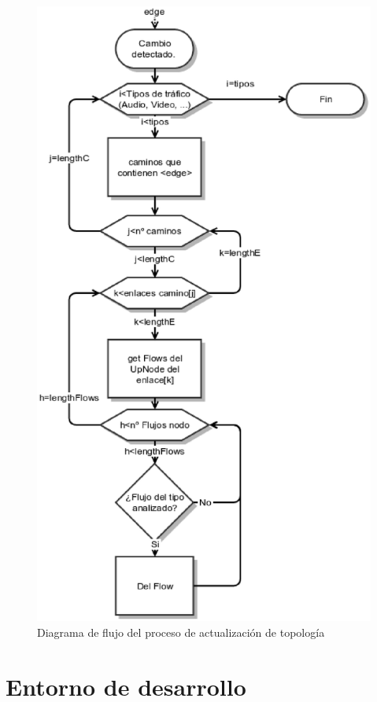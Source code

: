 \documentclass[a4paper,11pt]{book}
\begin{document}
\begin{figure}[tb]
\centering
\includegraphics[scale=0.7]{./figuras/updateTopology}
\caption{Diagrama de flujo del proceso de actualización de topología}\label{updateTopology}
\end{figure}

\chapter{Entorno de desarrollo}
\label{desarrollo}
 
\end{document}
